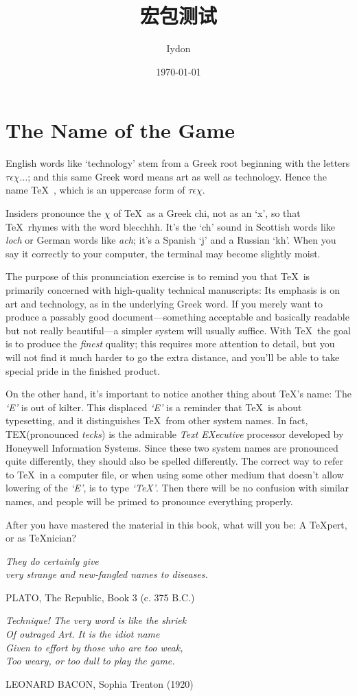 \documentclass[openany]{ctexbook}
\title{宏包测试}
\author{Iydon}
\date{\today}
\begin{document}
\startexercise
\maketitle\clearpage\tableofcontents\clearpage

\chapter{The Name of the Game}
English words like ‘technology’ stem from a Greek root beginning with the letters $\tau\epsilon\chi\ldots$; and this same Greek word means art as well as technology. Hence the name \TeX\ , which is an uppercase form of $\tau\epsilon\chi$.\par
Insiders pronounce the $\chi$ of \TeX\ as a Greek chi, not as an ‘x’, so that \TeX\ rhymes with the word blecchhh. It’s the ‘ch’ sound in Scottish words like \emph{loch} or German words like \emph{ach}; it’s a Spanish ‘j’ and a Russian ‘kh’. When you say it correctly to your computer, the terminal may become slightly moist.\par
The purpose of this pronunciation exercise is to remind you that \TeX\ is primarily concerned with high-quality technical manuscripts: Its emphasis is on art and technology, as in the underlying Greek word. If you merely want to produce a passably good document---something acceptable and basically readable but not really beautiful---a simpler system will usually suffice. With \TeX\ the goal is to produce the \emph{finest} quality; this requires more attention to detail, but you will not find it much harder to go the extra distance, and you’ll be able to take special pride in the finished product.\par
On the other hand, it's important to notice another thing about \TeX's name: The \emph{`E'} is out of kilter. This displaced \emph{`E'} is a reminder that \TeX\ is about typesetting, and it distinguishes \TeX\ from other system names. In fact, TEX(pronounced \emph{tecks}) is the admirable \emph{Text EXecutive} processor developed by Honeywell Information Systems. Since these two system names are pronounced quite differently, they should also be spelled differently. The correct way to refer to \TeX\ in a computer file, or when using some other medium that doesn't allow lowering of the \emph{`E'}, is to type \emph{`TeX'}. Then there will be no confusion with similar names, and people will be primed to pronounce everything properly.
\begin{exercise}
  \item After you have mastered the material in this book, what will you be: A \TeX pert, or as \TeX nician?
\end{exercise}
\epigraph{\sl They do certainly give\\very strange and new-fangled names to diseases.}{PLATO, The Republic, Book 3 (c. 375 B.C.)}
\epigraph{\sl Technique! The very word is like the shriek\\Of outraged Art. It is the idiot name\\Given to effort by those who are too weak,\\Too weary, or too dull to play the game.}{LEONARD BACON, Sophia Trenton (1920)}
\end{document}
